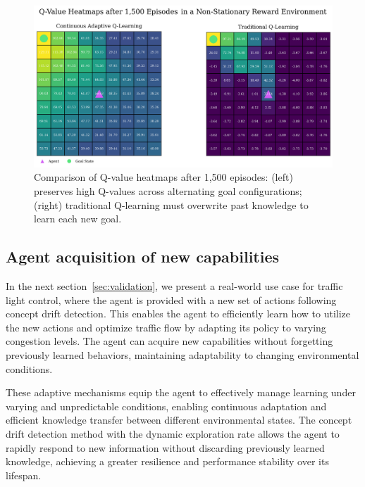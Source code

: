 \begin{figure}
    \centering
    \includegraphics[width=\textwidth]{figures/q_map_comp.png}
    \caption{Comparison of Q-value heatmaps after 1,500 episodes: (left) \adaptiverl preserves high Q-values across alternating goal configurations; (right) traditional Q-learning must overwrite past knowledge to learn each new goal.}
    \label{fig:q-value-comp}
\end{figure}

\subsection{Agent acquisition of new capabilities}
In the next section~\ref{sec:validation}, we present a real-world use case for traffic light control, where the agent is provided with a new set of actions following concept drift detection. This enables the agent to efficiently learn how to utilize the new actions and optimize traffic flow by adapting its policy to varying congestion levels. The agent can acquire new capabilities without forgetting previously learned behaviors, maintaining adaptability to changing environmental conditions.

These adaptive mechanisms equip the agent to effectively manage learning under varying and unpredictable conditions, enabling continuous adaptation and efficient knowledge transfer between different environmental states. The concept drift detection method with the dynamic exploration rate allows the agent to rapidly respond to new information without discarding previously learned knowledge, achieving a greater resilience and performance stability over its lifespan. 

\endinput

